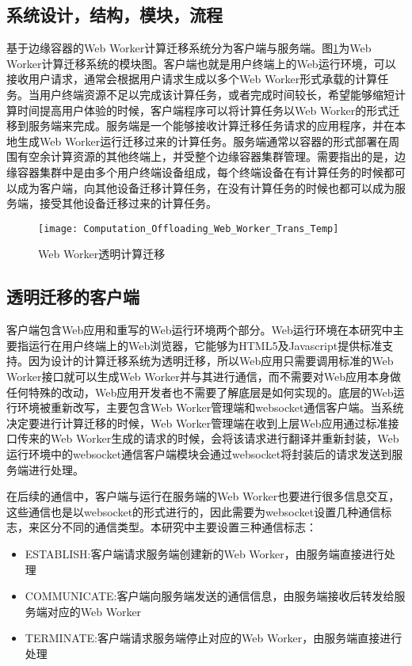 \subsection{系统设计，结构，模块，流程}

基于边缘容器的Web Worker计算迁移系统分为客户端与服务端。图\ref{fig:computation_offloading_web_worker_trans}为Web Worker计算迁移系统的模块图。客户端也就是用户终端上的Web运行环境，可以接收用户请求，通常会根据用户请求生成以多个Web Worker形式承载的计算任务。当用户终端资源不足以完成该计算任务，或者完成时间较长，希望能够缩短计算时间提高用户体验的时候，客户端程序可以将计算任务以Web Worker的形式迁移到服务端来完成。服务端是一个能够接收计算迁移任务请求的应用程序，并在本地生成Web Worker运行迁移过来的计算任务。服务端通常以容器的形式部署在周围有空余计算资源的其他终端上，并受整个边缘容器集群管理。需要指出的是，边缘容器集群中是由多个用户终端设备组成，每个终端设备在有计算任务的时候都可以成为客户端，向其他设备迁移计算任务，在没有计算任务的时候也都可以成为服务端，接受其他设备迁移过来的计算任务。
\begin{figure}[!htbp]
    \centering
    \texttt{[image: Computation\_Offloading\_Web\_Worker\_Trans\_Temp]}
    \caption{Web Worker透明计算迁移}
    \label{fig:computation_offloading_web_worker_trans}
\end{figure}

\subsection{透明迁移的客户端}

客户端包含Web应用和重写的Web运行环境两个部分。Web运行环境在本研究中主要指运行在用户终端上的Web浏览器，它能够为HTML5及Javascript提供标准支持。因为设计的计算迁移系统为透明迁移，所以Web应用只需要调用标准的Web Worker接口就可以生成Web Worker并与其进行通信，而不需要对Web应用本身做任何特殊的改动，Web应用开发者也不需要了解底层是如何实现的。底层的Web运行环境被重新改写，主要包含Web Worker管理端和websocket通信客户端。当系统决定要进行计算迁移的时候，Web Worker管理端在收到上层Web应用通过标准接口传来的Web Worker生成的请求的时候，会将该请求进行翻译并重新封装，Web运行环境中的websocket通信客户端模块会通过websocket将封装后的请求发送到服务端进行处理。

在后续的通信中，客户端与运行在服务端的Web Worker也要进行很多信息交互，这些通信也是以websocket的形式进行的，因此需要为websocket设置几种通信标志，来区分不同的通信类型。本研究中主要设置三种通信标志：
\begin{itemize}
    \item ESTABLISH:客户端请求服务端创建新的Web Worker，由服务端直接进行处理
    \item COMMUNICATE:客户端向服务端发送的通信信息，由服务端接收后转发给服务端对应的Web Worker
    \item TERMINATE:客户端请求服务端停止对应的Web Worker，由服务端直接进行处理
\end{itemize}

